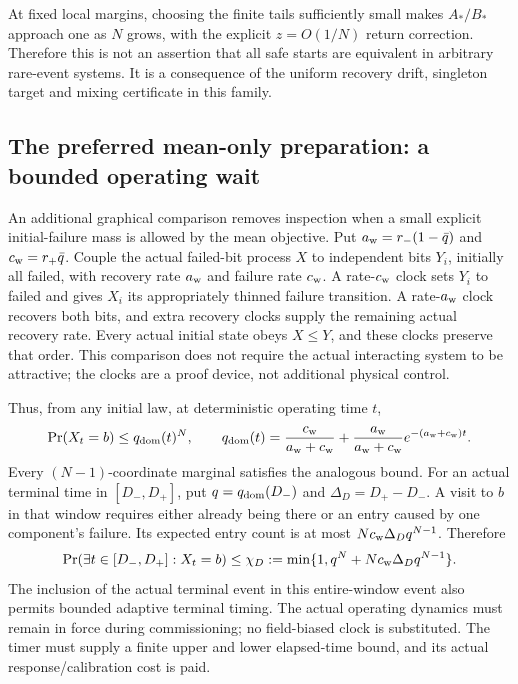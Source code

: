At fixed local margins, choosing the finite tails sufficiently small
makes $A_*/B_*$ approach one as $N$ grows, with the explicit
$z=O(1/N)$ return correction. Therefore this is not an assertion that
all safe starts are equivalent in arbitrary rare-event systems. It is
a consequence of the uniform recovery drift, singleton target and
mixing certificate in this family.

\subsection{The preferred mean-only preparation: a bounded operating wait}
An additional graphical comparison removes inspection when a small
explicit initial-failure mass is allowed by the mean objective. Put
$a_{\rm w}=r_-(1-\bar q)$ and $c_{\rm w}=r_+\bar q$.
Couple the actual failed-bit process $X$ to independent bits $Y_i$,
initially all failed, with recovery rate $a_{\rm w}$ and failure rate
$c_{\rm w}$. A rate-$c_{\rm w}$ clock sets $Y_i$ to failed and gives
$X_i$ its appropriately thinned failure transition. A rate-$a_{\rm w}$
clock recovers both bits, and extra recovery clocks supply the remaining
actual recovery rate. Every actual initial state obeys $X\le Y$, and
these clocks preserve that order. This comparison does not require the
actual interacting system to be attractive; the clocks are a proof
device, not additional physical control.

Thus, from any initial law, at deterministic operating time $t$,
\begin{equation}
 \Pr(X_t=b)\le q_{\rm dom}(t)^N,\qquad
 q_{\rm dom}(t)=\frac{c_{\rm w}}{a_{\rm w}+c_{\rm w}}
 +\frac{a_{\rm w}}{a_{\rm w}+c_{\rm w}}
                  e^{-(a_{\rm w}+c_{\rm w})t}.
 \label{eq:dominatedwarm}
\end{equation}
Every $(N-1)$-coordinate marginal satisfies the analogous bound.
For an actual terminal time in $[D_-,D_+]$, put
$q=q_{\rm dom}(D_-)$ and $\Delta_D=D_+-D_-$.
A visit to $b$ in that window requires either already being there or
an entry caused by one component's failure. Its expected entry count is
at most $Nc_{\rm w}\Delta_D q^{N-1}$. Therefore
\begin{equation}
 \Pr(\exists t\in[D_-,D_+]:X_t=b)
 \le\chi_D:=\min\{1,q^N+Nc_{\rm w}\Delta_Dq^{N-1}\}.
 \label{eq:finitewarm}
\end{equation}
The inclusion of the actual terminal event in this entire-window event
also permits bounded adaptive terminal timing. The actual operating
dynamics must remain in force during commissioning; no field-biased
clock is substituted. The timer must supply a finite upper and lower
elapsed-time bound, and its actual response/calibration cost is paid.

